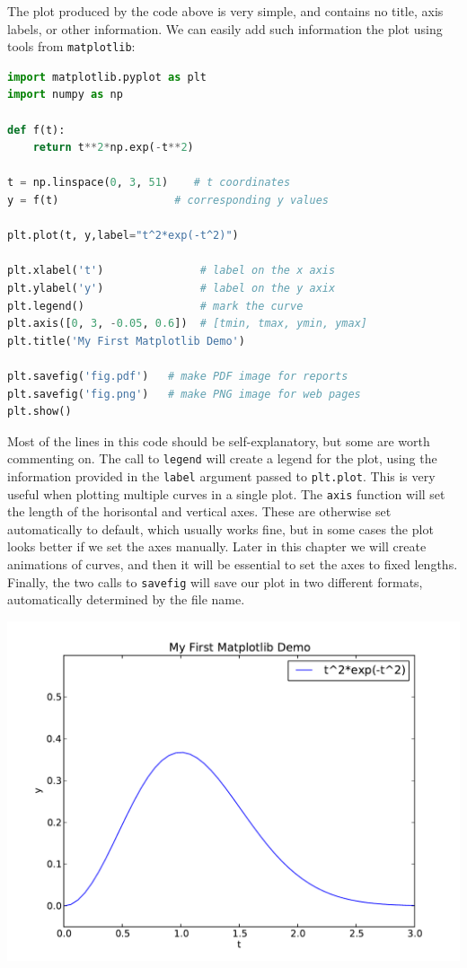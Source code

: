\documentclass[graybox,envcountchap,sectrefs,final]{svmonodo}
\begin{document}
\vspace{6mm}




The plot produced by the code above is very simple, and contains no title, axis labels, or other information.
We can easily add such information the plot using tools from \texttt{matplotlib}:
\begin{lstlisting}[language=Python,style=blue1]
import matplotlib.pyplot as plt
import numpy as np

def f(t):
    return t**2*np.exp(-t**2)

t = np.linspace(0, 3, 51)    # t coordinates
y = f(t)                  # corresponding y values

plt.plot(t, y,label="t^2*exp(-t^2)")

plt.xlabel('t')               # label on the x axis
plt.ylabel('y')               # label on the y axix
plt.legend()                  # mark the curve
plt.axis([0, 3, -0.05, 0.6])  # [tmin, tmax, ymin, ymax]
plt.title('My First Matplotlib Demo')

plt.savefig('fig.pdf')   # make PDF image for reports
plt.savefig('fig.png')   # make PNG image for web pages
plt.show()
\end{lstlisting}
Most of the lines in this code should be self-explanatory, but some are worth commenting on. The call to \texttt{legend} will
create a legend for the plot, using the information provided in the \texttt{label} argument passed to \texttt{plt.plot}. This is
very useful when plotting multiple curves in a single plot. The \texttt{axis} function will set the length of the
horisontal and vertical axes. These are otherwise set automatically to default, which usually works fine, but in
some cases the plot looks better if we set the axes manually. Later in this chapter
we will create animations of curves, and then it will be essential to set the axes to fixed lengths. Finally,
the two calls to \texttt{savefig} will save our plot in two different formats, automatically determined by the file name.



\vspace{6mm}

\centerline{\includegraphics[width=0.9\linewidth]{../chapters/fig-plot/plot1c_pylab.pdf}}
\end{document}
